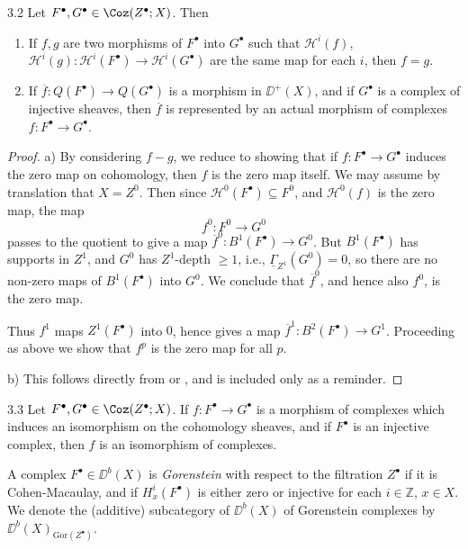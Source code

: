 \begin{booklemma}{3.2}\label{lem:4.3.2}
Let $F^\bullet,G^\bullet\in\Coz(Z^\bullet;X)$. Then
\begin{enumerate}
\item[a)] If $f,g$ are two morphisms of $F^\bullet$ into $G^\bullet$ such that $\mathcal{H}^{i}(f)$, $\mathcal{H}^{i}(g)\colon \mathcal{H}^{i}(F^\bullet)\to \mathcal{H}^{i}(G^\bullet)$ are the same map for each $i$, then $f=g$.
\item[b)] If $\overline{f}\colon Q(F^\bullet)\to Q(G^\bullet)$ is a morphism in $\DD^+(X)$, and if $G^\bullet$ is a complex of injective sheaves, then $\overline{f}$ is represented by an actual morphism of complexes $f\colon F^\bullet\to G^\bullet$.
\end{enumerate}
\end{booklemma}

\begin{proof}
a) By considering $f-g$, we reduce to showing that if $f\colon F^\bullet\to G^\bullet$ induces the zero map on cohomology, then $f$ is the zero map itself. We may assume by translation that $X=Z^0$. Then since $\mathcal{H}^0(F^\bullet)\subseteq F^0$, and $\mathcal{H}^0(f)$ is the zero map, the map
\[
f^0\colon F^0\longrightarrow G^0
\]
passes to the quotient to give a map $\overline{f}^0\colon B^1(F^\bullet)\to G^0$. But $B^1(F^\bullet)$ has supports in $Z^1$, and $G^0$ has $Z^1$-depth $\geq 1$, i.e., $\underline{\Gamma}_{Z^1}(G^0)=0$, so there are no non-zero maps of $B^1(F^\bullet)$ into $G^0$. We conclude that $\overline{f}^0$, and hence also $f^0$, is the zero map.

Thus $f^1$ maps $Z^1(F^\bullet)$ into $0$, hence gives a map $\overline{f}^1\colon B^2(F^\bullet)\to G^1$. Proceeding as above we show that $f^p$ is the zero map for all $p$.

b) This follows directly from  or , and is included only as a reminder.
\end{proof}

\begin{bookcorollary}{3.3}\label{cor:4.3.3}
Let $F^\bullet,G^\bullet\in\Coz(Z^\bullet;X)$. If $f\colon F^\bullet\to G^\bullet$ is a morphism of complexes which induces an isomorphism on the cohomology sheaves, and if $F^\bullet$ is an injective complex, then $f$ is an isomorphism of complexes.
\end{bookcorollary}

\begin{definition*}
A complex $F^\bullet\in\DD^b(X)$ is \emph{Gorenstein} with respect to the filtration $Z^\bullet$ if it is Cohen-Macaulay, and if $H_x^{i}(F^\bullet)$ is either zero or injective for each $i\in\mathbb{Z}$, $x\in X$. We denote the (additive) subcategory of $\DD^b(X)$ of Gorenstein complexes by $\DD^b(X)_{\mathrm{Gor}(Z^\bullet)}$.
\end{definition*}

